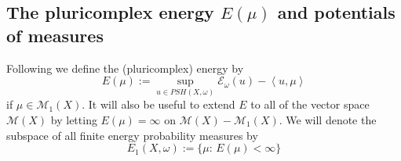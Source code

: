 \documentclass[11pt,oneside,english]{amsart}
\numberwithin{equation}{section}
\numberwithin{figure}{section}
\theoremstyle{plain}
\theoremstyle{plain}
\theoremstyle{plain}
\theoremstyle{plain}
\theoremstyle{remark}
\theoremstyle{definition}
\begin{document}
\subsection{\label{sub:The-pluricomplex-energy}The pluricomplex energy $E(\mu)$
and potentials of measures}

Following \cite{begz} we define the (pluricomplex) energy by 
\begin{equation}
E(\mu):=\sup_{u\in PSH(X,\omega)}\mathcal{E}_{\omega}(u)-\left\langle u,\mu\right\rangle \label{eq:def of e as sup}
\end{equation}
 if $\mu\in\mathcal{M}_{1}(X).$ It will also be useful to extend
$E$ to all of the vector space $\mathcal{M}(X)$ by letting $E(\mu)=\infty$
on $\mathcal{M}(X)-\mathcal{M}_{1}(X).$ We will denote the subspace
of all finite energy probability measures by 
\[
E_{1}(X,\omega):=\{\mu:\, E(\mu)<\infty\}
\]
\end{document}
